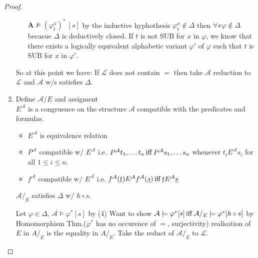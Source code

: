 \begin{proof}
\begin{enumerate}
\begin{claimproof}
\begin{itemize}
                $\mathbf{A} \not\models (\varphi^x_t)^*\:  [s]$ by the inductive hyphothesis $\varphi^x_t\notin\Delta$ then $\forall x \varphi \notin \Delta$ becasue $\Delta$ is deductively closed.
                If $t$ is not SUB for $x$ in $\varphi$, we know that there exists a logically equivalent alphabetic variant $\varphi'$ of $\varphi$ such that $t$ is SUB for $x$ in $\varphi'$.
            \end{itemize}
        \end{claimproof} 
        So at this point we have: 
        If $\mathcal{L}$ does not contain $=$ then take $\mathcal{A}$ reduction to $\mathcal{L}$ and $\mathcal{A}$ w/s satisfies $\Delta$.
        \item Define $\mathcal{A}/E$ and assigment \\
         $E^\mathcal{A}$ is a congruence on the structure $\mathcal{A}$ compatible with the predicates and formulas.
        \begin{itemize}
            \item $E^\mathcal{A}$ is equivalence relation
            \item $P^\mathcal{A}$ compatible w/ $E^\mathcal{A}$ i.e. $P^\mathcal{A}t_1,\dots t_n \operatorname{iff} P^\mathcal{A} s_1,\dots s_n$ whenever $t_i E^\mathcal{A} s_i$ for all $1\leq i \leq n$.
            \item $f^\mathcal{A}$ compatible w/ $E^\mathcal{A}$ i.e. $f^\mathcal{A}(\underline{t})E^\mathcal{A} f^\mathcal{A}(\underline{s})\operatorname{iff} \underline{t}E^\mathcal{A}\underline{s}$
        \end{itemize}
         $\mathcal{A}/_E$ satisfies $\Delta$ w/ $h\circ s$.
        \begin{claimproof}
            Let $\varphi\in \Delta$, $\mathcal{A}\models \varphi^*[s]$ by (4)
            Want to show $\mathcal{A}\models \varphi^*[s] \operatorname{iff} \mathcal{A}/_E \models \varphi^* [h\circ s]$ by Homomorphism Thm.($\varphi^*$ has no occurence of $=$, surjectivity)
            realisation of $E$ in $A/_E$ is the equality in $A/_E$.
            Take the reduct of $\mathcal{A}/_E$ to $\mathcal{L}$. 
        \end{claimproof}
    \end{enumerate}
\end{proof}

